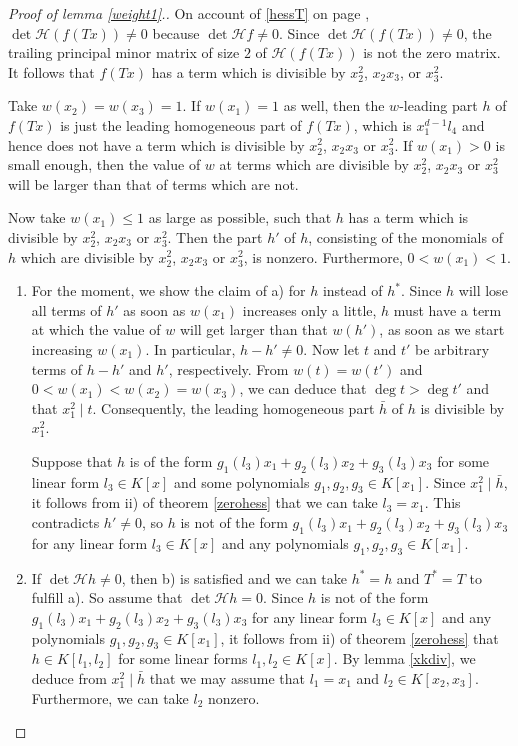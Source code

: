 \documentclass[10pt]{article}
\theoremstyle{remark}
\theoremstyle{definition}
\newcommand{\hess}{{\mathcal H}}
\begin{document}
\begin{proof}[Proof of lemma \ref{weight1}.]
On account of \eqref{hessT} on page \pageref{hessT}, $\det \hess (f(Tx)) \ne 0$ because $\det \hess f \ne 0$.
Since $\det \hess (f(Tx)) \ne 0$, the trailing principal minor matrix of size $2$ of $\hess (f(Tx))$
is not the zero matrix. It follows that $f(Tx)$ has a term which is divisible by 
$x_2^2$, $x_2x_3$, or $x_3^2$.

Take $w(x_2) = w(x_3) = 1$. If $w(x_1) = 1$ as well, then the $w$-leading part $h$ of $f(Tx)$
is just the leading homogeneous part of $f(Tx)$, which is $x_1^{d-1} l_4$ and hence does not 
have a term which is divisible by $x_2^2$, $x_2x_3$ or $x_3^2$. If $w(x_1) > 0$ is small enough, 
then the value of $w$ at terms which are divisible by $x_2^2$, $x_2x_3$ or $x_3^2$ will be
larger than that of terms which are not. 

Now take $w(x_1) \le 1$ as large as possible, such that 
$h$ has a term which is divisible by $x_2^2$, $x_2x_3$ or $x_3^2$. 
Then the part $h'$ of $h$,
consisting of the monomials of $h$ which are divisible by $x_2^2$, $x_2x_3$ or $x_3^2$, is nonzero.
Furthermore, $0 < w(x_1) < 1$.
\begin{enumerate}

\item[a)] For the moment, we show the claim of a) for $h$ instead of $h^{*}$.
Since $h$ will lose all terms of $h'$ as soon as $w(x_1)$ increases only a little, 
$h$ must have a term at which the value of $w$ will get larger than that $w(h')$, 
as soon as we start increasing $w(x_1)$. In particular, $h - h' \ne 0$. Now let $t$ and $t'$
be arbitrary terms of $h - h'$ and $h'$, respectively. From $w(t) = w(t')$ and 
$0 < w(x_1) < w(x_2) = w(x_3)$, we can deduce that $\deg t > \deg t'$ and that $x_1^2 \mid t$.
Consequently, the leading homogeneous part $\bar{h}$ of $h$ is divisible by $x_1^2$.

Suppose that $h$ is of the form $g_1(l_3) x_1 + g_2(l_3) x_2 + g_3(l_3)x_3$ for some
linear form $l_3 \in K[x]$ and some polynomials $g_1, g_2, g_3 \in K[x_1]$. Since
$x_1^2 \mid \bar{h}$, it follows from ii) of theorem \ref{zerohess} that we can take
$l_3 = x_1$. This contradicts $h' \ne 0$, so $h$ is not of the form 
$g_1(l_3) x_1 + g_2(l_3) x_2 + g_3(l_3)x_3$ for any linear form $l_3 \in K[x]$ and any
polynomials $g_1, g_2, g_3 \in K[x_1]$.

\item[b)] If $\det \hess h \ne 0$, then b) is satisfied and we can take $h^{*} = h$ and 
$T^{*} = T$ to fulfill a). So assume that $\det \hess h = 0$. Since $h$ is not of the form 
$g_1(l_3) x_1 + g_2(l_3) x_2 + g_3(l_3)x_3$ for any linear form $l_3 \in K[x]$ and any
polynomials $g_1, g_2, g_3 \in K[x_1]$, it follows from ii) of theorem \ref{zerohess}
that $h \in K[l_1,l_2]$ for some linear forms $l_1, l_2 \in K[x]$. By lemma \ref{xkdiv},
we deduce from $x_1^2 \mid \bar{h}$ that we may assume that $l_1 = x_1$ and 
$l_2 \in K[x_2,x_3]$. Furthermore, we can take $l_2$ nonzero. 


\end{enumerate}
\end{proof}
\end{document}
